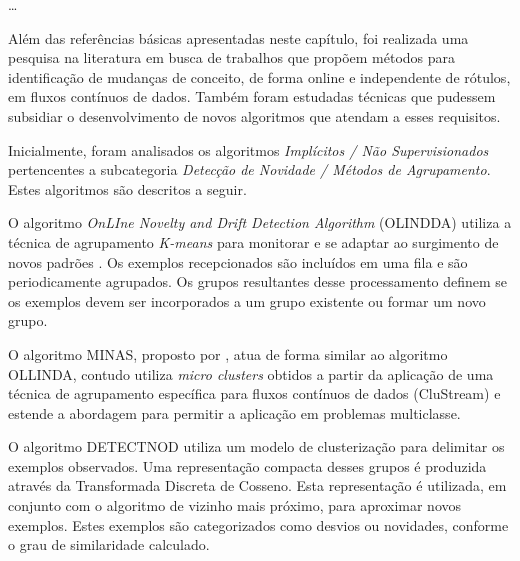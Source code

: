 \documentclass[msc, classic, a4paper]{ufbathesis}
\begin{document}
\ldots

Além das referências básicas apresentadas neste capítulo, foi realizada uma pesquisa na literatura em busca de trabalhos que propõem métodos para identificação de mudanças de conceito, de forma online e independente de rótulos, em fluxos contínuos de dados. Também foram estudadas técnicas que pudessem subsidiar o desenvolvimento de novos algoritmos que atendam a esses requisitos.

Inicialmente, foram analisados os algoritmos \textit{Implícitos / Não Supervisionados} pertencentes a subcategoria \textit{Detecção de Novidade / Métodos de Agrupamento}. Estes algoritmos são descritos a seguir.


O algoritmo \textit{OnLIne Novelty and Drift Detection Algorithm} (OLINDDA) utiliza a técnica de agrupamento \textit{K-means} para monitorar e se adaptar ao surgimento de novos padrões \cite{Spinosa:2007:OCA:1244002.1244107}.
Os exemplos recepcionados são incluídos em uma fila e são periodicamente agrupados. Os grupos resultantes desse processamento definem se os exemplos devem ser incorporados a um grupo existente ou formar um novo grupo.

O algoritmo MINAS, proposto por , atua de forma similar ao algoritmo OLLINDA, contudo utiliza \textit{micro clusters} obtidos a partir da aplicação de uma técnica de agrupamento específica para fluxos contínuos de dados (CluStream) e estende a abordagem para permitir a aplicação em problemas multiclasse.

O algoritmo DETECTNOD \cite{Hashemi:Hayat:DETECTNOD:2010} utiliza um modelo de clusterização para delimitar os exemplos observados.
Uma representação compacta desses grupos é produzida através da Transformada Discreta de Cosseno. Esta representação é utilizada, em conjunto com o algoritmo de vizinho mais próximo, para aproximar novos exemplos.
Estes exemplos são categorizados como desvios ou novidades, conforme o grau de similaridade calculado.
\end{document}
